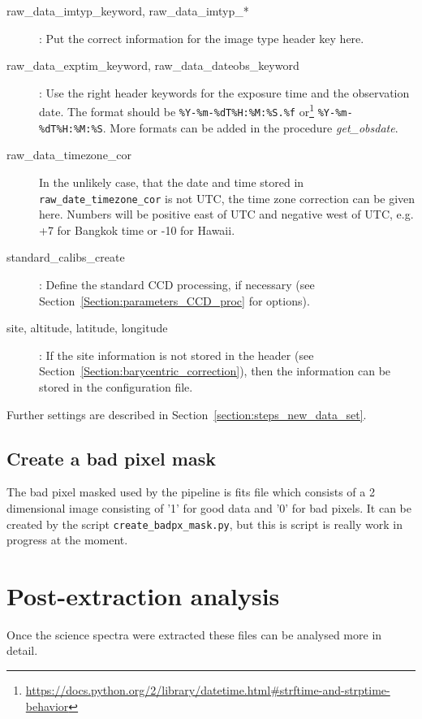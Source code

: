 \documentclass[10pt,a4paper]{article}
\begin{document}
\begin{description}
  \item[raw\_data\_imtyp\_keyword, raw\_data\_imtyp\_*] : Put the correct information for the image type header key here. 
  \item[raw\_data\_exptim\_keyword, raw\_data\_dateobs\_keyword] : Use the right header keywords for the exposure time and the observation date. The format should be \verb|%Y-%m-%dT%H:%M:%S.%f| or\footnote{\url{https://docs.python.org/2/library/datetime.html\#strftime-and-strptime-behavior}} \verb|%Y-%m-%dT%H:%M:%S|. More formats can be added in the procedure \textit{get\_obsdate}.
  \item[raw\_data\_timezone\_cor] In the unlikely case, that the date and time stored in \verb|raw_date_timezone_cor| is not UTC, the time zone correction can be given here. Numbers will be positive east of UTC and negative west of UTC, e.g. +7 for Bangkok time or -10 for Hawaii.
  \item[standard\_calibs\_create] : Define the standard CCD processing, if necessary (see Section~\ref{Section:parameters_CCD_proc} for options).
  \item[site, altitude, latitude, longitude] : If the site information is not stored in the header (see Section~\ref{Section:barycentric_correction}), then the information can be stored in the configuration file.
\end{description}

\noindent Further settings are described in Section~\ref{section:steps_new_data_set}.

\subsection{Create a bad pixel mask}
\noindent The bad pixel masked used by the pipeline is fits file which consists of a 2 dimensional image consisting of '1' for good data and '0' for bad pixels. It can be created by the script \verb|create_badpx_mask.py|, but this is script is really work in progress at the moment.


\newpage
\section{Post-extraction analysis}

\noindent Once the science spectra were extracted these files can be analysed more in detail. 
\end{document}
